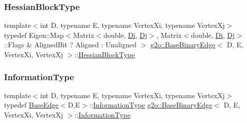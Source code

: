 \mbox{\label{classg2o_1_1_base_binary_edge_a7eadbbe6abffe4d2ebdf6231272789a5}} 
\subsubsection{\texorpdfstring{Hessian\+Block\+Type}{HessianBlockType}}
{\footnotesize\ttfamily template$<$int D, typename E, typename Vertex\+Xi, typename Vertex\+Xj$>$ \\
typedef Eigen\+::\+Map$<$Matrix$<$double, \mbox{\hyperlink{classg2o_1_1_base_binary_edge_abfe232196405a7204bc299a747c1cc8b}{Di}}, \mbox{\hyperlink{classg2o_1_1_base_binary_edge_ab718b94950a34d589371fe6f5583b259}{Dj}}$>$, Matrix$<$double, \mbox{\hyperlink{classg2o_1_1_base_binary_edge_abfe232196405a7204bc299a747c1cc8b}{Di}}, \mbox{\hyperlink{classg2o_1_1_base_binary_edge_ab718b94950a34d589371fe6f5583b259}{Dj}}$>$\+::Flags \& Aligned\+Bit ? Aligned \+: Unaligned $>$ \mbox{\hyperlink{classg2o_1_1_base_binary_edge}{g2o\+::\+Base\+Binary\+Edge}}$<$ D, E, Vertex\+Xi, Vertex\+Xj $>$\+::\mbox{\hyperlink{classg2o_1_1_base_binary_edge_a7eadbbe6abffe4d2ebdf6231272789a5}{Hessian\+Block\+Type}}}

\mbox{\label{classg2o_1_1_base_binary_edge_a4530ef6462aadaf2ab826d440d3b3318}} 
\subsubsection{\texorpdfstring{Information\+Type}{InformationType}}
{\footnotesize\ttfamily template$<$int D, typename E, typename Vertex\+Xi, typename Vertex\+Xj$>$ \\
typedef \mbox{\hyperlink{classg2o_1_1_base_edge}{Base\+Edge}}$<$D,E$>$\+::\mbox{\hyperlink{classg2o_1_1_base_binary_edge_a4530ef6462aadaf2ab826d440d3b3318}{Information\+Type}} \mbox{\hyperlink{classg2o_1_1_base_binary_edge}{g2o\+::\+Base\+Binary\+Edge}}$<$ D, E, Vertex\+Xi, Vertex\+Xj $>$\+::\mbox{\hyperlink{classg2o_1_1_base_binary_edge_a4530ef6462aadaf2ab826d440d3b3318}{Information\+Type}}}

